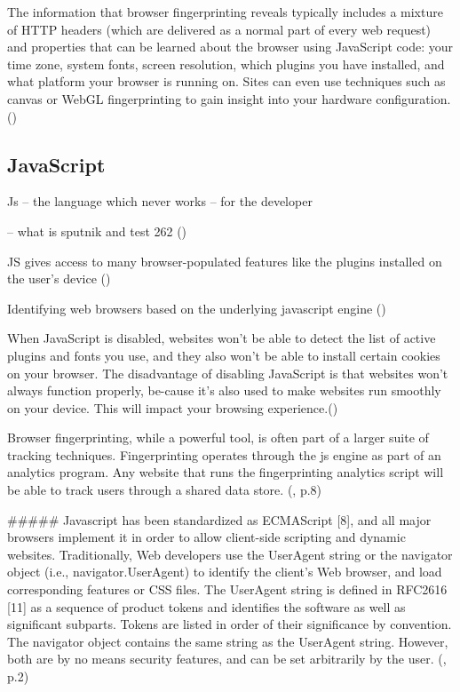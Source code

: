 The information that browser fingerprinting reveals typically includes a mixture of HTTP headers (which are delivered as a normal part of every web request) and properties that can be learned about the browser using JavaScript code: your time zone, system fonts, screen resolution, which plugins you have installed, and what platform your browser is running on. Sites can even use techniques such as canvas or WebGL fingerprinting to gain insight into your hardware configuration.(\textcite{miele18})

\subsection{JavaScript}

Js – the language which never works – for the developer

-- what is sputnik and test 262 ()

JS gives access to many browser-populated features like the plugins installed on the user’s device (\textcite{amiunique})

Identifying web browsers based on the underlying javascript engine
(\textcite{mulazzani13})

When JavaScript is disabled, websites won’t be able to detect the list of active plugins and fonts you use, and they also won’t be able to install certain cookies on your browser.
The disadvantage of disabling JavaScript is that websites won’t always function properly, be-cause it’s also used to make websites run smoothly on your device. This will impact your browsing experience.(\textcite{pixel18})

Browser fingerprinting, while a powerful tool, is often part of a larger suite of tracking techniques. Fingerprinting operates through the js engine as part of an analytics program. Any website that runs the fingerprinting analytics script will be able to track users through a shared data store.
(\textcite{havens16}, p.8)

#####
Javascript has been standardized as ECMAScript [8],
and all major browsers implement it in order to allow
client-side scripting and dynamic websites. Traditionally,
Web developers use the UserAgent string or the navigator
object (i.e., navigator.UserAgent) to identify the client’s
Web browser, and load corresponding features or CSS files.
The UserAgent string is defined in RFC2616 [11] as a
sequence of product tokens and identifies the software as
well as significant subparts. Tokens are listed in order of their
significance by convention. The navigator object contains the
same string as the UserAgent string. However, both are by
no means security features, and can be set arbitrarily by the
user.
(\textcite{mulazzani13}, p.2)\\


